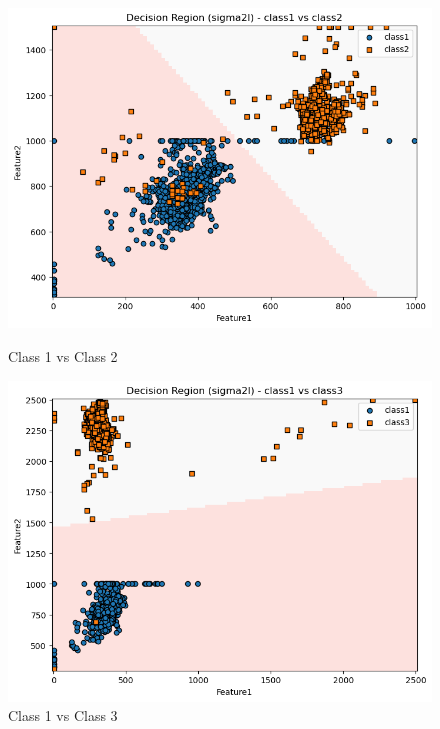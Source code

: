 \begin{figure}[H]
    \centering
    \begin{minipage}{0.32\linewidth}
        \includegraphics[width=\linewidth]{images/RD_Group04_images/01_sigma2i/02_decision_region_c1_c2.png}
        \caption*{Class 1 vs Class 2}
    \end{minipage}
    \hfill
    \begin{minipage}{0.32\linewidth}
        \includegraphics[width=\linewidth]{images/RD_Group04_images/01_sigma2i/03_decision_region_c1_c3.png}
        \caption*{Class 1 vs Class 3}
    \end{minipage}
    \hfill
    \begin{minipage}{0.32\linewidth}

\end{minipage}
\end{figure}
